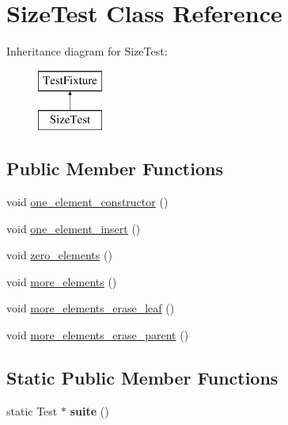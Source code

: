 \hypertarget{class_size_test}{}\section{Size\+Test Class Reference}
\label{class_size_test}
Inheritance diagram for Size\+Test\+:\begin{figure}[H]
\begin{center}
\leavevmode
\includegraphics[height=2.000000cm]{class_size_test}
\end{center}
\end{figure}
\subsection*{Public Member Functions}
\begin{DoxyCompactItemize}
\item 
void \hyperlink{class_size_test_a85261b7c20794c5d64335ca31cdf37cf}{one\+\_\+element\+\_\+constructor} ()
\item 
void \hyperlink{class_size_test_a0aca43b07dd7f2dc7abb018193c7957a}{one\+\_\+element\+\_\+insert} ()
\item 
void \hyperlink{class_size_test_aaed7bed9e378c1d8f57b841b20f25caa}{zero\+\_\+elements} ()
\item 
void \hyperlink{class_size_test_a8746c855c3846914d88c34c061197682}{more\+\_\+elements} ()
\item 
void \hyperlink{class_size_test_a02868a105b57f585aaa7d435c3208d61}{more\+\_\+elements\+\_\+erase\+\_\+leaf} ()
\item 
void \hyperlink{class_size_test_addf81e5e704a50add6060c1810eabba9}{more\+\_\+elements\+\_\+erase\+\_\+parent} ()
\end{DoxyCompactItemize}
\subsection*{Static Public Member Functions}
\begin{DoxyCompactItemize}
\item 
\mbox{\label{class_size_test_ad83c4e302657fd74119fbcc78f31e47f}} 
static Test $\ast$ {\bfseries suite} ()
\end{DoxyCompactItemize}


